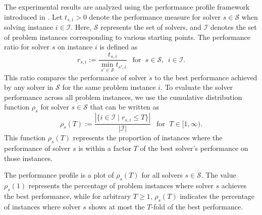 The experimental results are analyzed using the performance profile framework introduced in \cite{Dolan&More}. Let $t_{s,i} > 0$ denote the performance measure for solver $s \in \mathcal{S}$ when solving instance $i \in \mathcal{I}$. Here, $\mathcal{S}$ represents the set of solvers, and $\mathcal{I}$ denotes the set of problem instances corresponding to various starting points. The performance ratio for solver $s$ on instance $i$ is defined as 
\[
 r_{s,i} := \frac{t_{s,i}}{\min_{s' \in \mathcal{S}} t_{s',i}} \;\,\mbox{ for }\;  s \in \mathcal{S},\;\, i \in \mathcal{I}. 
\]
This ratio compares the performance of solver $s$ to the best performance achieved by any solver in $\mathcal{S}$ for the same problem instance $i$.
To evaluate the solver performance across all problem instances, we use the cumulative distribution function $\rho_s$ for solver $s \in \mathcal{S}$ that can be written as 
\[
\rho_s(T) := \frac{|\{i \in \mathcal{I} \mid r_{s,i} \leq T\}|}{|\mathcal{I}|} \;\,\mbox{ for }\;  T \in [1, \infty).
\]
This function $\rho_s(T)$ represents the proportion of instances where the performance of solver $s$ is within a factor $T$ of the best solver's performance on those instances.

The performance profile is a plot of $\rho_s(T)$ for all solvers $s \in \mathcal{S}$. The value $\rho_s(1)$ represents the percentage of problem instances where solver $s$ achieves the best performance, while for arbitrary $T \geq 1$, $\rho_s(T)$ indicates the percentage of instances where solver $s$ shows at most the $T$-fold of the best performance.

 

